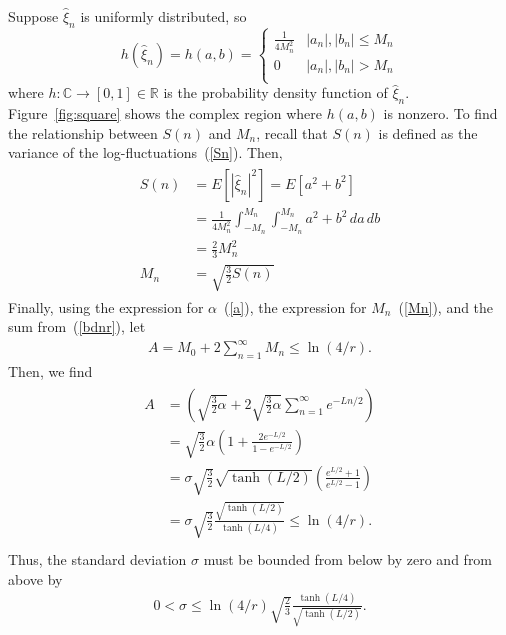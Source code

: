 Suppose $\hat{\xi}_n$ is uniformly distributed, so 
\begin{equation}\label{eq:square}
   h(\hat{\xi}_n) =h(a,b)= \left\{
     \begin{array}{lr}
       \frac{1}{4 M_n^2} & |a_n|,|b_n| \leq M_n\\
       0 & |a_n|,|b_n| > M_n\\
     \end{array}
   \right.
\end{equation} 
where $h:\mathbb{C}\to [0,1]\in \mathbb{R}$ is the probability density
function of $\hat{\xi}_n$. Figure~\ref{fig:square} shows the complex
region where $h(a,b)$ is nonzero. To find the relationship between $S(n)$ and
$M_n$, recall that $S(n)$ is defined as the variance of the
log-fluctuations~(\ref{Sn}). Then, 
\begin{align}
\begin{split}\label{Mn}
S(n)&=E[|\hat{\xi}_n|^2] = E[a^2+b^2]\\
 &= \frac{1}{4M_n^2}\int_{-M_n}^{M_n}\int_{-M_n}^{M_n}a^2+b^2\,da\,db\\
&=\frac{2}{3}M_n^2\\
M_n&=\sqrt{\frac{3}{2}S(n)}
\end{split}
\end{align}
Finally, using the expression for $\alpha$~(\ref{a}), the
expression for $M_n$~(\ref{Mn}), and the sum from~(\ref{bdnr}), let
\begin{align*}
A = M_0+2\sum_{n=1}^\infty M_n \leq \ln(4/r).
\end{align*}
Then, we find
\begin{align*}
\begin{split}
A &=\left(\sqrt{\frac{3}{2}\alpha} +
2\sqrt{\frac{3}{2}\alpha}\sum_{n=1}^{\infty}e^{-Ln/2}\right) \\
&= \sqrt{\frac{3}{2}}\alpha\left(1+ \frac{2e^{-L/2}}{1-e^{-L/2}} \right)\\
&= \sigma\sqrt{\frac{3}{2}}
\sqrt{\tanh(L/2)}\left(\frac{e^{L/2}+1}{e^{L/2}-1} \right)\\
&= \sigma \sqrt{\frac{3}{2}}\frac{\sqrt{\tanh(L/2)}}{\tanh(L/4)} \leq \ln(4/r).\\
\end{split}
\end{align*}
Thus, the standard deviation $\sigma$ must be bounded from below by
zero and from above by
\begin{align}\label{sigma}
0<\sigma \leq \ln(4/r)\sqrt{\frac{2}{3}}\frac{\tanh(L/4)}{\sqrt{\tanh(L/2)}}.
\end{align}
